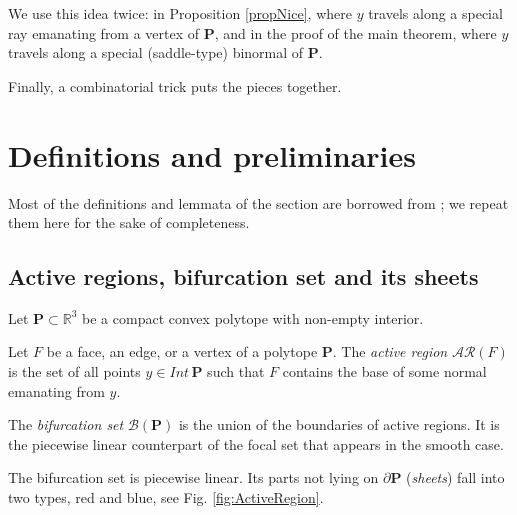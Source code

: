 \documentclass[12pt]{amsart}
\newtheorem*{main lemma}{The main lemma}
\begin{document}
 We use this idea twice: in Proposition \ref{propNice}, where $y$ travels along a special ray emanating from a vertex of $\mathbf{P}$, and  in the proof of the main theorem, where $y$ travels along a special (saddle-type) binormal of $\mathbf{P}$.  
 
Finally, a combinatorial trick puts the pieces together.




\medskip

\newpage

\section{Definitions and preliminaries}\label{SecDefPrelim}



Most of the definitions and lemmata of the section are borrowed from \cite{NasPanSiersma}; we repeat them here for the sake of completeness.
\subsection{Active regions, bifurcation set and its sheets}
Let $\mathbf{P}\subset \mathbb{R}^3$ be a compact convex polytope with non-empty interior.




Let $F$ be a face, an edge, or a vertex of a polytope $\mathbf{P}$. The \textit{active region} $\mathcal{AR}(F)$ is the set of all points $y\in Int\, \mathbf{P}$ such that $F$ contains the base of some normal emanating from $y$. 



 

The\textit{ bifurcation set}  $\mathcal{B}(\mathbf{P})$ is the union of the boundaries of active regions. It is the piecewise linear counterpart of the focal set that appears in the smooth case.

The bifurcation set is piecewise linear. Its  parts not lying on $\partial \mathbf{P}$ (\textit{sheets}) fall into two types, red and blue, see  Fig. \ref{fig:ActiveRegion}.
\end{document}
